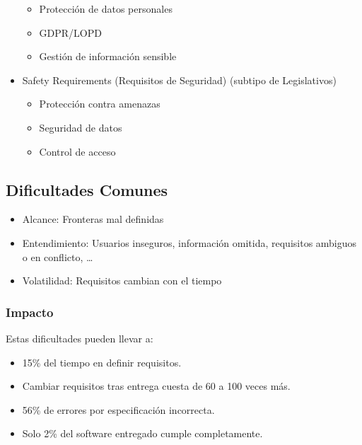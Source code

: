 \begin{itemize}
\begin{itemize}
            \item Protección de datos personales

            \item GDPR/LOPD

            \item Gestión de información sensible

        \end{itemize}



        \item Safety Requirements (Requisitos de Seguridad) (subtipo de Legislativos)
        \begin{itemize}

            \item Protección contra amenazas

            \item Seguridad de datos

            \item Control de acceso
        \end{itemize}

    \end{itemize}

    \subsection{Dificultades Comunes}\label{subsec:dificultades-comunes}

    \begin{itemize}

        \item Alcance: Fronteras mal definidas

        \item Entendimiento: Usuarios inseguros, información  omitida, requisitos ambiguos o en conflicto, \ldots

        \item Volatilidad: Requisitos cambian con el tiempo
    \end{itemize}

    \subsubsection{Impacto}
    Estas dificultades pueden llevar a:

    \begin{itemize}

        \item 15\% del tiempo en definir requisitos.

        \item Cambiar requisitos tras entrega cuesta de 60 a 100 veces más.

        \item 56\% de errores por especificación incorrecta.

        \item Solo 2\% del software entregado cumple completamente.

    \end{itemize}

